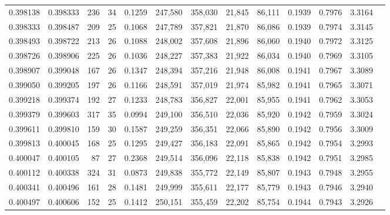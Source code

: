 \begin{tabular}{rrrrrrrrrrrrr}
0.398138 & 0.398333 &   236 &  34 &                                     0.1259 & 247,580 & 358,030 &  21,845 &  86,111 & 0.1939 & 0.7976 & 3.3164 \\
0.398333 & 0.398487 &   209 &  25 &                                     0.1068 & 247,789 & 357,821 &  21,870 &  86,086 & 0.1939 & 0.7974 & 3.3145 \\
0.398493 & 0.398722 &   213 &  26 &                                     0.1088 & 248,002 & 357,608 &  21,896 &  86,060 & 0.1940 & 0.7972 & 3.3125 \\
0.398726 & 0.398906 &   225 &  26 &                                     0.1036 & 248,227 & 357,383 &  21,922 &  86,034 & 0.1940 & 0.7969 & 3.3105 \\
0.398907 & 0.399048 &   167 &  26 &                                     0.1347 & 248,394 & 357,216 &  21,948 &  86,008 & 0.1941 & 0.7967 & 3.3089 \\
0.399050 & 0.399205 &   197 &  26 &                                     0.1166 & 248,591 & 357,019 &  21,974 &  85,982 & 0.1941 & 0.7965 & 3.3071 \\
0.399218 & 0.399374 &   192 &  27 &                                     0.1233 & 248,783 & 356,827 &  22,001 &  85,955 & 0.1941 & 0.7962 & 3.3053 \\
0.399379 & 0.399603 &   317 &  35 &                                     0.0994 & 249,100 & 356,510 &  22,036 &  85,920 & 0.1942 & 0.7959 & 3.3024 \\
0.399611 & 0.399810 &   159 &  30 &                                     0.1587 & 249,259 & 356,351 &  22,066 &  85,890 & 0.1942 & 0.7956 & 3.3009 \\
0.399813 & 0.400045 &   168 &  25 &                                     0.1295 & 249,427 & 356,183 &  22,091 &  85,865 & 0.1942 & 0.7954 & 3.2993 \\
0.400047 & 0.400105 &    87 &  27 &                                     0.2368 & 249,514 & 356,096 &  22,118 &  85,838 & 0.1942 & 0.7951 & 3.2985 \\
0.400112 & 0.400338 &   324 &  31 &                                     0.0873 & 249,838 & 355,772 &  22,149 &  85,807 & 0.1943 & 0.7948 & 3.2955 \\
0.400341 & 0.400496 &   161 &  28 &                                     0.1481 & 249,999 & 355,611 &  22,177 &  85,779 & 0.1943 & 0.7946 & 3.2940 \\
0.400497 & 0.400606 &   152 &  25 &                                     0.1412 & 250,151 & 355,459 &  22,202 &  85,754 & 0.1944 & 0.7943 & 3.2926 \\

\end{tabular}
